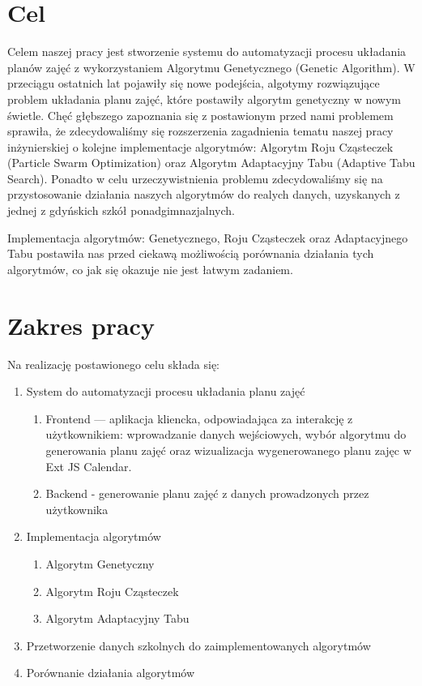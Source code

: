 \section{Cel}
\par Celem naszej pracy jest stworzenie systemu do automatyzacji procesu układania planów zajęć z wykorzystaniem Algorytmu Genetycznego (Genetic Algorithm).  W przeciągu ostatnich lat pojawiły się nowe podejścia, algotymy rozwiązujące problem układania planu zajęć, które postawiły algorytm genetyczny w nowym świetle. Chęć głębszego zapoznania się z postawionym przed nami problemem sprawiła, że zdecydowaliśmy się rozszerzenia zagadnienia tematu naszej pracy inżynierskiej o kolejne implementacje algorytmów: Algorytm Roju Cząsteczek (Particle Swarm Optimization) oraz Algorytm Adaptacyjny Tabu (Adaptive Tabu Search). Ponadto w celu urzeczywistnienia problemu zdecydowaliśmy się na przystosowanie działania naszych algorytmów do realych danych, uzyskanych z jednej z gdyńskich szkół ponadgimnazjalnych.
\par Implementacja algorytmów: Genetycznego, Roju Cząsteczek oraz Adaptacyjnego Tabu postawiła nas przed ciekawą możliwością porównania działania tych algorytmów, co jak się okazuje nie jest łatwym zadaniem.
\section{Zakres pracy}
\par Na realizację postawionego celu składa się:
\begin{enumerate}
\item System do automatyzacji procesu układania planu zajęć
\begin{enumerate}
\item Frontend — aplikacja kliencka, odpowiadająca za interakcję z użytkownikiem: wprowadzanie danych wejściowych, wybór algorytmu do generowania planu zajęć oraz wizualizacja wygenerowanego planu zajęc w Ext JS Calendar.
\item Backend - generowanie planu zajęć z danych prowadzonych przez użytkownika 
\end{enumerate}
\item Implementacja algorytmów
\begin{enumerate}
\item Algorytm Genetyczny
\item Algorytm Roju Cząsteczek
\item Algorytm Adaptacyjny Tabu
\end{enumerate}
\item Przetworzenie danych szkolnych do zaimplementowanych algorytmów
\item Porównanie działania algorytmów

\end{enumerate}


